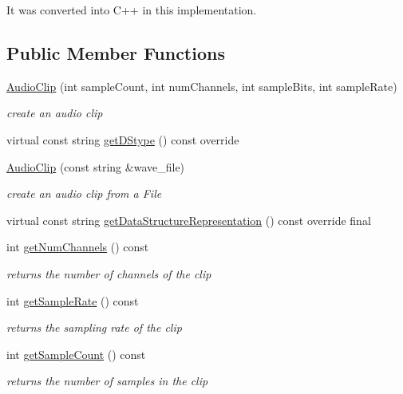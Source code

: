 It was converted into C++ in this implementation. \subsection*{Public Member Functions}
\begin{DoxyCompactItemize}
\item 
\hyperlink{classbridges_1_1datastructure_1_1_audio_clip_aa4db655f2e904a30742d45408ff6543c}{Audio\+Clip} (int sample\+Count, int num\+Channels, int sample\+Bits, int sample\+Rate)
\begin{DoxyCompactList}\small\item\em create an audio clip \end{DoxyCompactList}\item 
virtual const string \hyperlink{classbridges_1_1datastructure_1_1_audio_clip_a1fc853180a8d825b2e5ea2d8e3f8e810}{get\+D\+Stype} () const override
\item 
\hyperlink{classbridges_1_1datastructure_1_1_audio_clip_a3e13f90a853b5a2053725f550393f0de}{Audio\+Clip} (const string \&wave\+\_\+file)
\begin{DoxyCompactList}\small\item\em create an audio clip from a File \end{DoxyCompactList}\item 
virtual const string \hyperlink{classbridges_1_1datastructure_1_1_audio_clip_a9ff485d7b2e0211d9e5c1432d47be617}{get\+Data\+Structure\+Representation} () const override final
\item 
int \hyperlink{classbridges_1_1datastructure_1_1_audio_clip_acc378f797b1b6e3cfb778c1ccdc23dba}{get\+Num\+Channels} () const
\begin{DoxyCompactList}\small\item\em returns the number of channels of the clip \end{DoxyCompactList}\item 
int \hyperlink{classbridges_1_1datastructure_1_1_audio_clip_a520e4a9bbe0685b3598d90668172618c}{get\+Sample\+Rate} () const
\begin{DoxyCompactList}\small\item\em returns the sampling rate of the clip \end{DoxyCompactList}\item 
int \hyperlink{classbridges_1_1datastructure_1_1_audio_clip_aaaee4b34cd512c02a0c0ea072782a9d6}{get\+Sample\+Count} () const
\begin{DoxyCompactList}\small\item\em returns the number of samples in the clip \end{DoxyCompactList}\item 

\end{DoxyCompactItemize}
